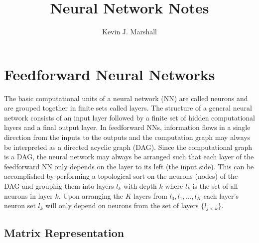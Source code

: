 \documentclass[12pt,notitlepage]{article}
\begin{document}
\title{Neural Network Notes}
\author{Kevin J. Marshall}
\maketitle

\section{Feedforward Neural Networks}
\label{sec:ff-=nn}
The basic computational units of a neural network (NN) are called neurons
and are grouped together in finite sets called layers.  The structure of a
general neural network consists of an input layer followed by a finite
set of hidden computational layers and a final output layer.  In
feedforward NNs, information flows in a single direction from the
inputs to the outputs and the computation graph may always be
interpreted as a directed acyclic
graph (DAG).  Since the computational graph is a DAG, the neural
network may always be arranged such that each layer of the feedforward
NN only depends on  the layer to its left (the input side).  This can
be accomplished by performing a topological sort on the neurons
(nodes) of the DAG and
grouping them into layers $l_{k}$ with depth $k$ where $l_{k}$ is the
set of all neurons in layer $k$.  Upon arranging the $K$ layers from
$l_{0},l_{1},\dots,l_{K}$ each layer's neuron set $l_{k}$ will only depend
on neurons from the set of layers $\{l_{j<k}\}$.

\subsection{Matrix Representation}
\label{sec:matrix-rep}
\end{document}
